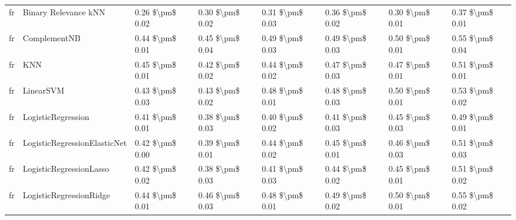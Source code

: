 \begin{tabular}{llllllll}
      fr &            Binary Relevance kNN & 0.26 \$\textbackslash pm\$ 0.02 &           0.30 \$\textbackslash pm\$ 0.02 &       0.31 \$\textbackslash pm\$ 0.03 &        0.36 \$\textbackslash pm\$ 0.02 &                         0.30 \$\textbackslash pm\$ 0.01 &     0.37 \$\textbackslash pm\$ 0.01 \\
      fr &                    ComplementNB & 0.44 \$\textbackslash pm\$ 0.01 &           0.45 \$\textbackslash pm\$ 0.04 &       0.49 \$\textbackslash pm\$ 0.03 &        0.49 \$\textbackslash pm\$ 0.03 &                         0.50 \$\textbackslash pm\$ 0.01 &     0.55 \$\textbackslash pm\$ 0.04 \\
      fr &                             KNN & 0.45 \$\textbackslash pm\$ 0.01 &           0.42 \$\textbackslash pm\$ 0.02 &       0.44 \$\textbackslash pm\$ 0.02 &        0.47 \$\textbackslash pm\$ 0.03 &                         0.47 \$\textbackslash pm\$ 0.01 &     0.51 \$\textbackslash pm\$ 0.01 \\
      fr &                       LinearSVM & 0.43 \$\textbackslash pm\$ 0.03 &           0.43 \$\textbackslash pm\$ 0.02 &       0.48 \$\textbackslash pm\$ 0.01 &        0.48 \$\textbackslash pm\$ 0.03 &                         0.50 \$\textbackslash pm\$ 0.01 &     0.53 \$\textbackslash pm\$ 0.02 \\
      fr &              LogisticRegression & 0.41 \$\textbackslash pm\$ 0.01 &           0.38 \$\textbackslash pm\$ 0.03 &       0.40 \$\textbackslash pm\$ 0.02 &        0.41 \$\textbackslash pm\$ 0.03 &                         0.45 \$\textbackslash pm\$ 0.03 &     0.49 \$\textbackslash pm\$ 0.01 \\
      fr &    LogisticRegressionElasticNet & 0.42 \$\textbackslash pm\$ 0.00 &           0.39 \$\textbackslash pm\$ 0.01 &       0.44 \$\textbackslash pm\$ 0.02 &        0.45 \$\textbackslash pm\$ 0.01 &                         0.46 \$\textbackslash pm\$ 0.03 &     0.51 \$\textbackslash pm\$ 0.03 \\
      fr &         LogisticRegressionLasso & 0.42 \$\textbackslash pm\$ 0.02 &           0.38 \$\textbackslash pm\$ 0.03 &       0.41 \$\textbackslash pm\$ 0.03 &        0.44 \$\textbackslash pm\$ 0.02 &                         0.45 \$\textbackslash pm\$ 0.01 &     0.51 \$\textbackslash pm\$ 0.02 \\
      fr &         LogisticRegressionRidge & 0.44 \$\textbackslash pm\$ 0.01 &           0.46 \$\textbackslash pm\$ 0.03 &       0.48 \$\textbackslash pm\$ 0.01 &        0.49 \$\textbackslash pm\$ 0.02 &                         0.50 \$\textbackslash pm\$ 0.01 &     0.55 \$\textbackslash pm\$ 0.02 \\

\end{tabular}
